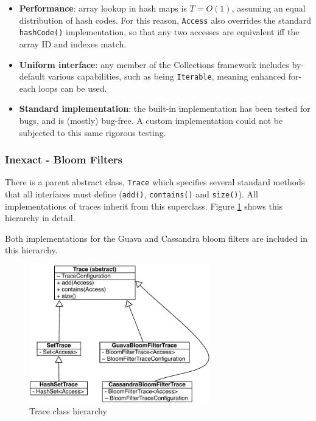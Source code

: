 		\begin{itemize}
			\item \textbf{Performance}: array lookup in hash maps is $T=O(1)$, assuming an equal distribution of hash codes. For this reason, \texttt{Access} also overrides the standard \texttt{hashCode()} implementation, so that any two accesses are equivalent iff the array ID and indexes match.
			
			\item \textbf{Uniform interface}: any member of the Collections framework includes by-default various capabilities, such as being \texttt{Iterable}, meaning enhanced for-each loops can be used.
			
			\item \textbf{Standard implementation}: the built-in implementation has been tested for bugs, and is (mostly) bug-free. A custom implementation could not be subjected to this same rigorous testing.
		\end{itemize}
		
		\subsubsection{Inexact - Bloom Filters} 
		There is a parent abstract class, \texttt{Trace} which specifies several standard methods that all interfaces must define (\texttt{add()}, \texttt{contains()} and \texttt{size()}). All implementations of traces inherit from this superclass. Figure \ref{fig:trace-classes} shows this hierarchy in detail.
		
		Both implementations for the Guava and Cassandra bloom filters are included in this hierarchy.
		
		\begin{figure}
			\centering
			\includegraphics[width=0.7\textwidth]{graphics/trace-classes.pdf}
			\caption{Trace class hierarchy}
			\label{fig:trace-classes}
		\end{figure}
		
